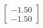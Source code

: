 \documentclass[preview]{standalone}
\begin{document}
\begin{align*}
\begin{bmatrix} -1.50 \\ -1.50 \end{bmatrix}
\end{align*}
\end{document}
